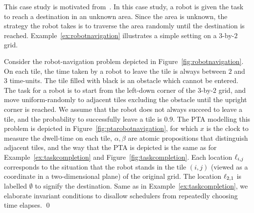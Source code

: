 This case study is motivated from~\cite{DBLP:conf/tacas/BarbotCHKM11}.
In this case study, a robot is given the task to reach a destination in an unknown area.
Since the area is unknown,
the strategy the robot takes is to traverse the area randomly until the destination is reached.
Example~\ref{ex:robotnavigation} illustrates a simple setting on a $3$-by-$2$ grid.



\begin{example}\label{ex:robotnavigation}
Consider the robot-navigation problem depicted in Figure~\ref{fig:robotnavigation}.
On each tile, the time taken by a robot to leave the tile is always between $2$ and $3$ time-units.
The tile filled with black is an obstacle which cannot be entered.
The task for a robot is to start from the left-down corner of the $3$-by-$2$ grid, and move uniform-randomly to adjacent tiles excluding the obstacle until the upright corner is reached.
We assume that the robot does not always succeed to leave a tile, and the probability to successfully leave a tile is $0.9$.
The PTA modelling this problem is depicted in Figure~\ref{fig:ptarobotnavigation},
for which $x$ is the clock to measure the dwell-time on each tile, $\alpha,\beta$ are atomic propositions that distinguish adjacent tiles, and the way that the PTA is depicted is the same as for Example~\ref{ex:taskcompletion} and Figure~\ref{fig:taskcompletion}.
Each location $\ell_{i,j}$ corresponds to the situation that the robot stands in the tile $(i,j)$ (viewed as a coordinate in a two-dimensional plane) of the original grid.
The location $\ell_{2,1}$ is labelled $\emptyset$ to signify the destination.
Same as in Example~\ref{ex:taskcompletion}, we elaborate invariant conditions to disallow schedulers from repeatedly choosing time elapses. \qed
\end{example}

